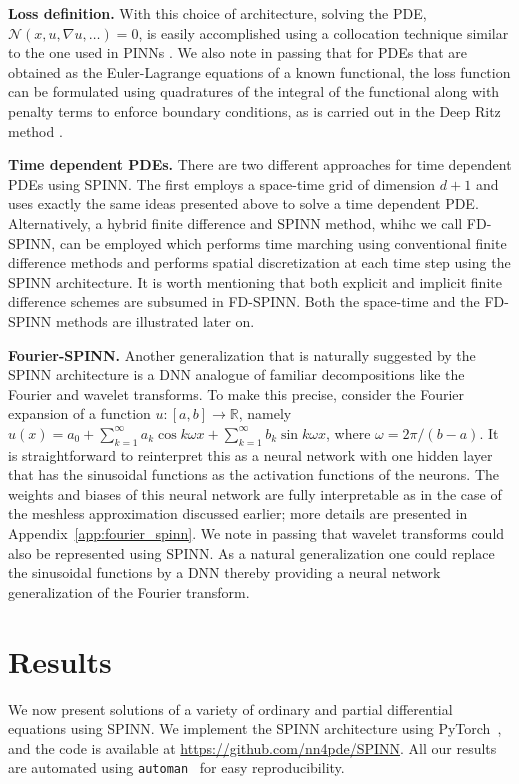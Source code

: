 \documentclass[12pt]{article}
\newcommand{\code}[1]{\lstinline{#1}}
\begin{document}
\textbf{Loss definition.} With this choice of architecture, solving the PDE, $\mathcal{N}(x, u, \nabla u, \ldots) = 0$, is easily accomplished using a collocation technique similar to the one used in PINNs \cite{RPK2019}. We also note in passing that for PDEs that are obtained as the Euler-Lagrange equations of a known functional, the loss function can be formulated using quadratures of the integral of the functional along with penalty terms to enforce boundary conditions, as is carried out in the Deep Ritz method \cite{EYu2018}.

\textbf{Time dependent PDEs.} There are two different approaches for time dependent PDEs using SPINN. The first employs a space-time grid of dimension $d + 1$ and uses exactly the same ideas presented above to solve a time dependent PDE. Alternatively, a hybrid finite difference and SPINN method, whihc we call FD-SPINN, can be employed which performs time marching using conventional finite difference methods and performs spatial discretization at each time step using the SPINN architecture. It is worth mentioning that both explicit and implicit finite difference schemes are subsumed in FD-SPINN. Both the space-time and the FD-SPINN methods are illustrated later on. 


\textbf{Fourier-SPINN.} Another generalization that is naturally suggested by the SPINN architecture is a DNN analogue of familiar decompositions like the Fourier and wavelet transforms. To make this precise, consider the Fourier expansion of a function $u:[a,b] \to \mathbb{R}$, namely $u(x) = a_0 + \sum_{k=1}^{\infty} a_k \cos k\omega x + \sum_{k=1}^{\infty} b_k \sin k\omega x$, where $\omega = 2\pi/(b - a)$. It is straightforward to reinterpret this as a neural network with one hidden layer that has the sinusoidal functions as the activation functions of the neurons. The weights and biases of this neural network are fully interpretable as in the case of the meshless approximation discussed earlier; more details are presented in Appendix~\ref{app:fourier_spinn}. We note in passing that wavelet transforms could also be represented using SPINN. As a natural generalization one could replace the sinusoidal functions by a DNN thereby providing a neural network generalization of the Fourier transform.  

\section*{Results}
We now present solutions of a variety of ordinary and partial differential equations using SPINN. We implement the SPINN architecture using PyTorch~\cite{pytorch}, and the code is available at \url{https://github.com/nn4pde/SPINN}. All our results are automated using \code{automan}~\cite{automan:2018} for easy reproducibility.
\end{document}
